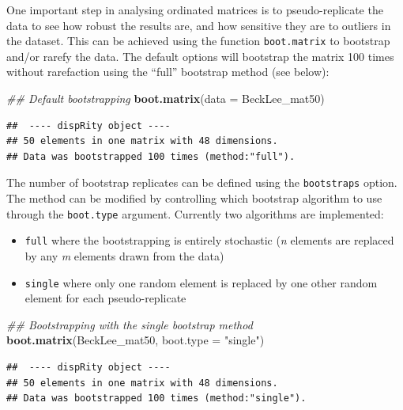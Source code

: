 \documentclass[]{book}
\newenvironment{Shaded}{\begin{snugshade}}{\end{snugshade}}
\newcommand{\CommentTok}[1]{\textcolor[rgb]{0.56,0.35,0.01}{\textit{#1}}}
\newcommand{\DataTypeTok}[1]{\textcolor[rgb]{0.13,0.29,0.53}{#1}}
\newcommand{\KeywordTok}[1]{\textcolor[rgb]{0.13,0.29,0.53}{\textbf{#1}}}
\newcommand{\NormalTok}[1]{#1}
\newcommand{\StringTok}[1]{\textcolor[rgb]{0.31,0.60,0.02}{#1}}
\providecommand{\tightlist}{%
  \setlength{\itemsep}{0pt}\setlength{\parskip}{0pt}}
\begin{document}
One important step in analysing ordinated matrices is to pseudo-replicate the data to see how robust the results are, and how sensitive they are to outliers in the dataset.
This can be achieved using the function \texttt{boot.matrix} to bootstrap and/or rarefy the data.
The default options will bootstrap the matrix 100 times without rarefaction using the ``full'' bootstrap method (see below):

\begin{Shaded}
\begin{Highlighting}[]
\CommentTok{## Default bootstrapping}
\KeywordTok{boot.matrix}\NormalTok{(}\DataTypeTok{data =}\NormalTok{ BeckLee_mat50)}
\end{Highlighting}
\end{Shaded}

\begin{verbatim}
##  ---- dispRity object ---- 
## 50 elements in one matrix with 48 dimensions.
## Data was bootstrapped 100 times (method:"full").
\end{verbatim}

The number of bootstrap replicates can be defined using the \texttt{bootstraps} option.
The method can be modified by controlling which bootstrap algorithm to use through the \texttt{boot.type} argument.
Currently two algorithms are implemented:

\begin{itemize}
\tightlist
\item
  \texttt{full} where the bootstrapping is entirely stochastic (\emph{n} elements are replaced by any \emph{m} elements drawn from the data)
\item
  \texttt{single} where only one random element is replaced by one other random element for each pseudo-replicate
\end{itemize}

\begin{Shaded}
\begin{Highlighting}[]
\CommentTok{## Bootstrapping with the single bootstrap method}
\KeywordTok{boot.matrix}\NormalTok{(BeckLee_mat50, }\DataTypeTok{boot.type =} \StringTok{"single"}\NormalTok{)}
\end{Highlighting}
\end{Shaded}

\begin{verbatim}
##  ---- dispRity object ---- 
## 50 elements in one matrix with 48 dimensions.
## Data was bootstrapped 100 times (method:"single").
\end{verbatim}
\end{document}

